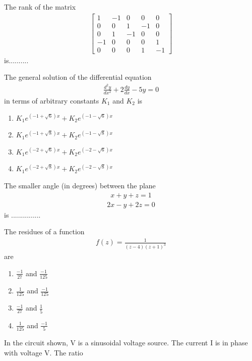 \item The rank of the matrix 
\begin{align*}
\begin{bmatrix} 
1 & -1 & 0 & 0 & 0 \\ 0 & 0 & 1 & -1 & 0 \\ 0 & 1 & -1 & 0 & 0 \\ -1 & 0 & 0 & 0 & 1 \\ 0 & 0 & 0 & 1 & -1 
\end{bmatrix}
\end{align*}
is..........

\item The general solution of the differential equation 
\begin{align}
\frac{d^2 y}{d x^2} + 2 \frac{dy}{dx} - 5y = 0
\end{align}
in terms of arbitrary constants $K_1$ and $K_2$ is 
\begin{enumerate}
\item $K_1e^{(-1 + \sqrt{6})x} + K_2e^{(-1 - \sqrt{6})x}$
\item $K_1e^{(-1 + \sqrt{8})x} + K_2e^{(-1 - \sqrt{8})x}$
\item $K_1e^{(-2 + \sqrt{6})x} + K_2e^{(-2 - \sqrt{6})x}$
\item $K_1e^{(-2 + \sqrt{8})x} + K_2e^{(-2 - \sqrt{8})x}$
\end{enumerate}

\item The smaller angle (in degrees) between the plane 
\begin{align}
x + y + z = 1
\end{align}
\begin{align}
2x - y + 2z = 0
\end{align}
is ...............

\item The residues of a function 
\begin{align*}
f(z) = \frac{1}{(z - 4)(z + 1)^3} 
\end{align*}
are
\begin{enumerate}
\item $\frac{-1}{27}$ and $\frac{-1}{125}$
\item $\frac{1}{125}$ and $\frac{-1}{125}$
\item $\frac{-1}{27}$ and $\frac{1}{5}$
\item $\frac{1}{125}$ and $\frac{-1}{5}$
\end{enumerate}

\item In the circuit shown, V is a sinusoidal voltage source. The current I is in phase with voltage V. The ratio 

